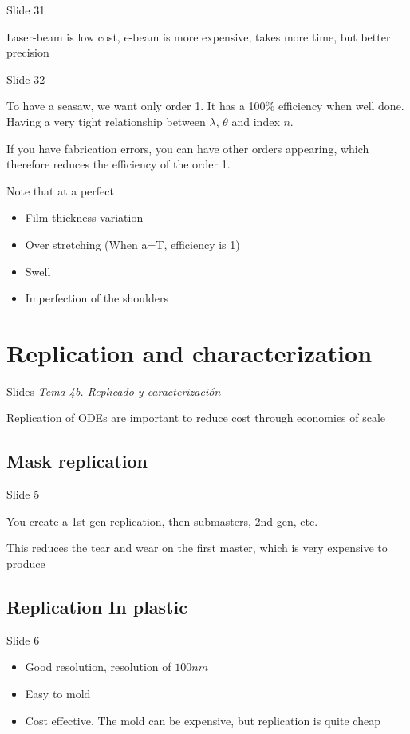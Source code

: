 \documentclass[../main/main.tex]{subfiles}
\begin{document}
Slide 31

Laser-beam is low cost, e-beam is more expensive, takes more time, but better precision


Slide 32

To have a seasaw, we want only order 1. It has a 100\% efficiency when well done. Having a very tight relationship between $\lambda$, $\theta$ and index $n$.

If you have fabrication errors, you can have other orders appearing, which therefore reduces the efficiency of the order 1.

Note that at a perfect
\begin{itemize}
	\item Film thickness variation
	\item Over stretching  (When a=T, efficiency is 1)
	\item Swell
	\item Imperfection of the shoulders
\end{itemize}


\section{Replication and characterization}

Slides \emph{Tema 4b. Replicado y caracterización}


Replication of ODEs are important to reduce cost through economies of scale

\subsection{Mask replication}
Slide 5

You create a 1st-gen replication, then submasters, 2nd gen, etc.

This reduces the tear and wear on the first master, which is very expensive to produce

\subsection{Replication In plastic}

Slide 6

\begin{itemize}
	\item Good resolution, resolution of $100 nm$
	\item Easy to mold
	\item Cost effective. The mold can be expensive, but replication is quite cheap
\end{itemize}
\end{document}
